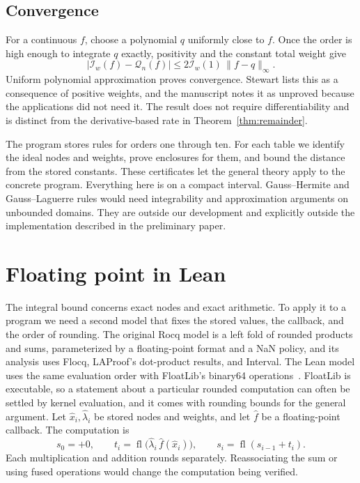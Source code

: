 \documentclass[11pt]{article}
\newcommand{\fl}{\operatorname{fl}}
\newcommand{\I}{\mathcal{I}}
\newcommand{\Q}{\mathcal{Q}}
\begin{document}
\subsection{Convergence}

For a continuous $f$, choose a polynomial $q$ uniformly close to $f$. Once
the order is high enough to integrate $q$ exactly, positivity and the
constant total weight give
\[
  |\I_w(f)-\Q_n(f)|
   \le 2\I_w(1)\,\|f-q\|_\infty.
\]
Uniform polynomial approximation proves convergence. Stewart lists this as
a consequence of positive weights, and the manuscript notes it as unproved
because the applications did not need it. The
result does not require differentiability and is distinct from the
derivative-based rate in Theorem~\ref{thm:remainder}.

The program stores rules for orders one through ten. For each table we
identify the ideal nodes and weights, prove enclosures for them, and bound
the distance from the stored constants. These certificates let the general
theory apply to the concrete program. Everything here is on a compact
interval. Gauss--Hermite and Gauss--Laguerre rules would need integrability
and approximation arguments on unbounded domains. They are outside our
development and explicitly outside the implementation described in the
preliminary paper.

\section{Floating point in Lean}
\label{sec:floating}

The integral bound concerns exact nodes and exact arithmetic. To apply it
to a program we need a second model that fixes the stored values, the
callback, and the order of rounding. The original Rocq model is a left fold
of rounded products and sums, parameterized by a floating-point format and
a NaN policy, and its analysis uses Flocq, LAProof's dot-product results,
and Interval. The Lean model uses the same evaluation order with FloatLib's
binary64 operations~\cite{floatlib}. FloatLib is executable, so a
statement about a particular rounded computation can often be settled by
kernel evaluation, and it comes with rounding bounds for the general
argument. Let $\widehat x_i,\widehat\lambda_i$ be stored nodes and weights,
and let $\widehat f$ be a floating-point callback. The computation is
\begin{equation}
 s_0=+0,\qquad
 t_i=\fl\bigl(\widehat\lambda_i\,\widehat f(\widehat x_i)\bigr),\qquad
 s_i=\fl(s_{i-1}+t_i).
 \label{eq:fold}
\end{equation}
Each multiplication and addition rounds separately. Reassociating the sum
or using fused operations would change the computation being verified.
\end{document}
